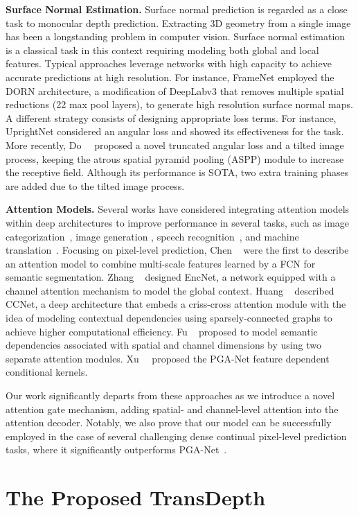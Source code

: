 \documentclass[10pt,twocolumn,letterpaper]{article}
\begin{document}
\noindent\textbf{Surface Normal Estimation.}
Surface normal prediction is regarded as a close task to monocular depth prediction.
Extracting 3D geometry from a single image has been a longstanding problem in computer vision. Surface normal estimation is a classical task in this context requiring modeling both global and local features. Typical approaches leverage networks with high capacity to achieve accurate predictions at high resolution. For instance, FrameNet \cite{huang2019framenet} employed the DORN \cite{fu2018deep} architecture, a modification of DeepLabv3 \cite{chen2017deeplab} that removes multiple spatial reductions (22 max pool layers), to generate high resolution surface normal maps. A different strategy consists of designing appropriate loss terms. For instance, UprightNet \cite{xian2019uprightnet} considered an angular loss and showed its effectiveness for the task. More recently, Do~\etal~\cite{do2020surface} proposed a novel truncated angular loss and a tilted image process, keeping the  atrous spatial pyramid pooling (ASPP) module to increase the receptive field. Although its performance is SOTA, two extra training phases are added due to the tilted image process.


\noindent\textbf{Attention Models.}
Several works have considered integrating attention models within deep architectures to improve performance in several tasks, such as image categorization~\cite{xiao2015application}, image generation \cite{tang2020xinggan}, speech recognition~\cite{chorowski2015attention}, and machine translation~\cite{vaswani2017attention}. Focusing on pixel-level prediction, Chen \etal~ \cite{chen2016attention} were the first to describe an attention model to combine multi-scale features learned by a FCN for semantic segmentation. Zhang \etal~\cite{zhang2018context} designed EncNet, a network equipped with a channel
attention mechanism to model the global context. 
Huang \etal~\cite{huang2019ccnet} described CCNet, a deep architecture that embeds a criss-cross attention module with the idea of modeling contextual dependencies using sparsely-connected graphs to achieve higher computational efficiency. Fu \etal~\cite{fu2019dual} proposed to model semantic dependencies associated with spatial and channel dimensions by using two separate attention modules. 
Xu \etal~\cite{xu2020probabilistic}~proposed the PGA-Net feature dependent conditional kernels.




Our work significantly departs from these approaches as we introduce a novel attention gate mechanism, adding spatial- and channel-level attention into the attention decoder. Notably, we also prove that our model can be successfully employed in the case of several challenging dense continual pixel-level prediction tasks, where it significantly outperforms PGA-Net~\cite{xu2020probabilistic}. \section{The Proposed TransDepth}
\end{document}
